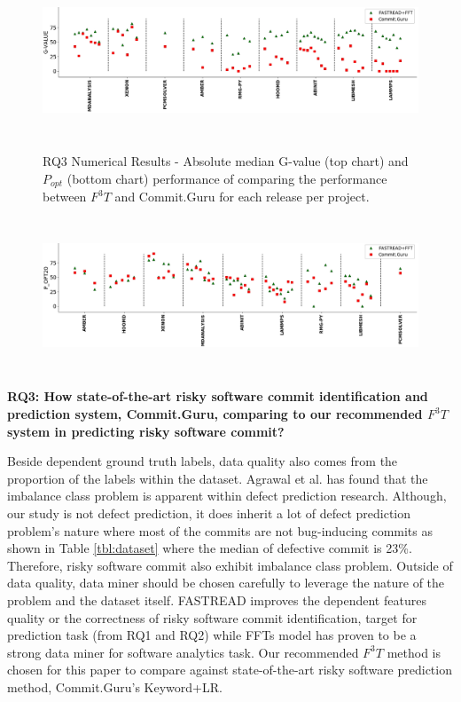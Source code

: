 \documentclass[sigconf,review, anonymous]{acmart}
\begin{document}
\begin{figure}[!t]
\caption{RQ3 Numerical Results - Absolute median G-value (top chart) and $P_{opt}$ (bottom chart) performance of comparing the performance between $F^3T$ and Commit.Guru for each release per project.}
\includegraphics[width=\linewidth, height=1.8in]{rq3_1.png}
\label{fig:rq3}
\vspace{-25pt}
\end{figure}
\begin{figure}[!t]
\includegraphics[width=\linewidth, height=1.8in]{rq3_2.png}
\vspace{-20pt}
\end{figure}

\textbf{RQ3: {How state-of-the-art risky software commit identification and prediction system, Commit.Guru, comparing to our recommended $F^3T$ system in predicting risky software commit?}}
 
Beside dependent ground truth labels, data quality also comes from the proportion of the labels within the dataset. Agrawal et al. \cite{agrawal2018better} has found that the imbalance class problem is apparent within defect prediction research. Although, our study is not defect prediction, it does inherit a lot of defect prediction problem's nature where most of the commits are not bug-inducing commits as shown in Table \ref{tbl:dataset} where the median of defective commit is 23\%. Therefore, risky software commit also exhibit imbalance class problem. Outside of data quality, data miner should be chosen carefully to leverage the nature of the problem and the dataset itself. FASTREAD improves the dependent features quality or the correctness of risky software commit identification, target for prediction task (from RQ1 and RQ2) while FFTs model has proven to be a strong data miner for software analytics task. Our recommended $F^3T$ method is chosen for this paper to compare against state-of-the-art risky software prediction method, Commit.Guru's Keyword+LR. 
\end{document}
